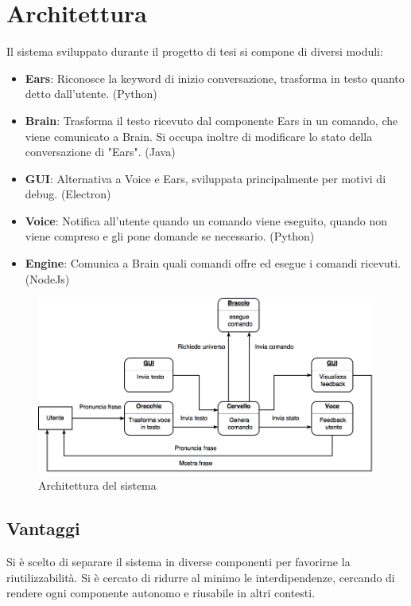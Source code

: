 \documentclass[twoside]{supsistudent}
\begin{document}
\chapter{Architettura}

Il sistema sviluppato durante il progetto di tesi si compone di diversi moduli:
\begin{itemize}
	\item \textbf{Ears}: Riconosce la keyword di inizio conversazione, trasforma in testo quanto detto dall'utente. (Python)
	\item \textbf{Brain}: Trasforma il testo ricevuto dal componente Ears in un comando, che viene comunicato a Brain. Si occupa inoltre di modificare lo stato della conversazione di "Ears". (Java)
	\item \textbf{GUI}: Alternativa a Voice e Ears, sviluppata principalmente per motivi di debug. (Electron)
	\item \textbf{Voice}: Notifica all'utente quando un comando viene eseguito, quando non viene compreso e gli pone domande se necessario. (Python)
	\item \textbf{Engine}: Comunica a Brain quali comandi offre ed esegue i comandi ricevuti. (NodeJs)
\end{itemize}
\begin{figure}[H]
\centering
\includegraphics[width=\textwidth]{Architettura}
\caption{Architettura del sistema}
\label{fig:pose}
\end{figure}
\section{Vantaggi}
Si è scelto di separare il sistema in diverse componenti per favorirne la riutilizzabilità. Si è cercato di ridurre al minimo le interdipendenze, cercando di rendere ogni componente autonomo e riusabile in altri contesti.
\end{document}

